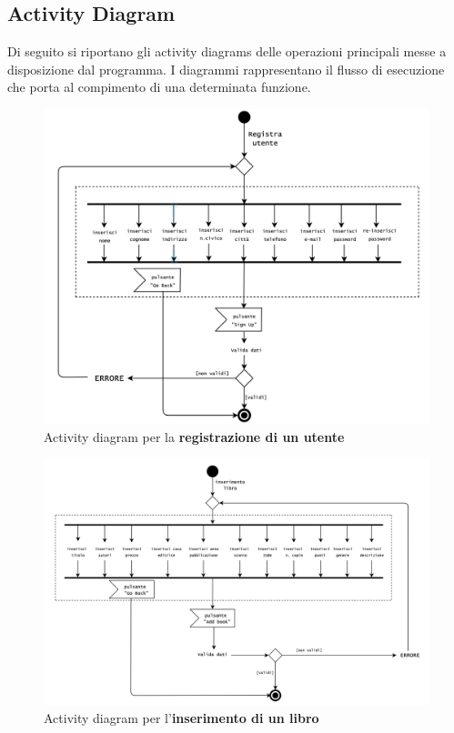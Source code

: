 \documentclass[12pt,a4paper]{article}
\begin{document}
	\subsection{Activity Diagram}
	Di seguito si riportano gli activity diagrams delle operazioni principali messe a disposizione dal programma. I diagrammi  rappresentano il flusso di esecuzione che porta al compimento di una determinata funzione.\\
	\begin{figure}[h!]
		\centering
		\includegraphics[scale=0.40]{images/ActivityDiagrams/RegistraUtente.png}
		\caption{Activity diagram per la \textbf{registrazione di un utente}}
	\end{figure}
	\begin{figure}[h!]
		\centering
		\includegraphics[scale=0.4]{images/ActivityDiagrams/InserimentoLibro.png}
		\caption{Activity diagram per l'\textbf{inserimento di un libro}}
	\end{figure}
\end{document}
